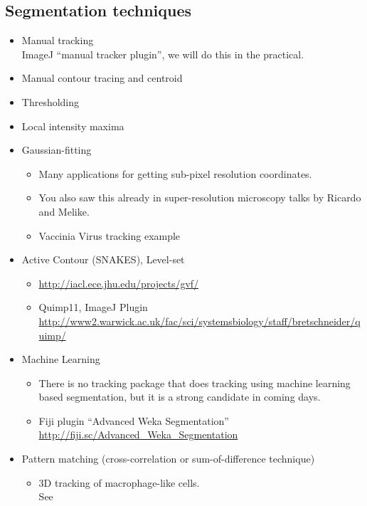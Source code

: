 \documentclass[11pnt]{article}
\begin{document}
\subsection{Segmentation techniques}
\begin{itemize}
\item Manual tracking\\
ImageJ ``manual tracker plugin'', we will do this in the practical.
\item Manual contour tracing and centroid
\item Thresholding
\item Local intensity maxima
\item Gaussian-fitting
\begin{itemize}
\item Many applications for getting sub-pixel resolution coordinates.
\item You also saw this already in super-resolution microscopy talks by Ricardo and Melike. 
\item Vaccinia Virus tracking example
\end{itemize}
\item Active Contour (SNAKES), Level-set
\begin{itemize} 
\item \url{http://iacl.ece.jhu.edu/projects/gvf/}
\item Quimp11, ImageJ Plugin\\ \url{http://www2.warwick.ac.uk/fac/sci/systemsbiology/staff/bretschneider/quimp/}
\end{itemize}
\item Machine Learning
\begin{itemize}
\item There is no tracking package that does tracking using machine learning based segmentation, but it is a strong candidate in coming days. 
\item Fiji plugin ``Advanced Weka Segmentation''\\
\url{http://fiji.sc/Advanced_Weka_Segmentation}
\end{itemize}
\item Pattern matching (cross-correlation or sum-of-difference technique)
\begin{itemize}
\item 3D tracking of macrophage-like cells. \\See \cite{Grabher2007}
\end{itemize}
\end{itemize}
\end{document}
